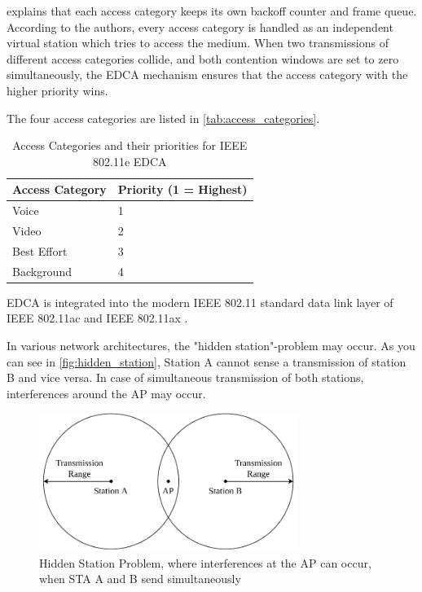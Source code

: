 \textcite{wu_ieee_2006} explains that each access category keeps its own backoff counter and frame queue.
According to the authors, every access category is handled as an independent virtual station which tries to access the medium.
When two transmissions of different access categories collide, and both contention windows are set to zero simultaneously,
the \ac{EDCA} mechanism ensures that the access category with the higher priority wins.

The four access categories are listed in \autoref{tab:access_categories}.
\begin{table}[H]
   \centering
   \begin{tabular}{>{\raggedright}p{2.5cm}p{3.2cm}}
      \toprule
      Access Category & Priority (1 = Highest)\\
      \midrule
      Voice & 1 \\
      Video & 2 \\
      Best Effort & 3 \\
      Background & 4 \\
      \bottomrule
   \end{tabular}
   \caption{Access Categories and their priorities for IEEE 802.11e \ac{EDCA} \cite{wu_ieee_2006}}
   \label{tab:access_categories}
\end{table}

\ac{EDCA} is integrated into the modern IEEE 802.11 standard data link layer of IEEE 802.11ac \cite{ieee_standard_2020}
and IEEE 802.11ax \cite{ieee_standard_2021ax}.

In various network architectures, the "hidden station"-problem may occur.
As you can see in \autoref{fig:hidden_station}, Station A cannot sense a transmission of station B and vice versa.
In case of simultaneous transmission of both stations, interferences around the \ac{AP} may occur.
\begin{figure}[H]%
   \centering
   \includegraphics[width=0.75\textwidth]{Latex/figures/hidden_station.pdf}
   \caption{Hidden Station Problem, where interferences at the \acf{AP} can occur, when \acf{STA} A and B send simultaneously}%
   \label{fig:hidden_station}%
\end{figure}

